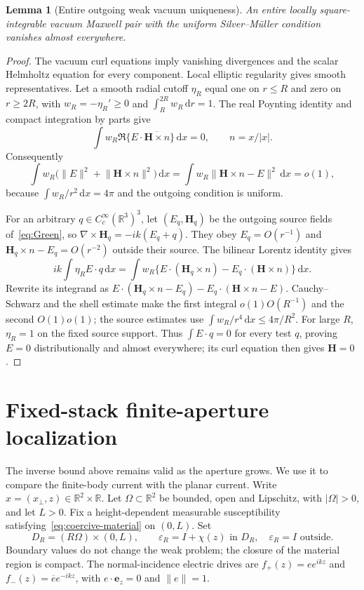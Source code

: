 \documentclass[11pt,a4paper]{article}
\newtheorem{lemma}[theorem]{Lemma}
\theoremstyle{remark}
\newcommand{\norm}[1]{\lVert #1\rVert}
\newcommand{\abs}[1]{\lvert #1\rvert}
\newcommand{\dd}{\,\mathrm d}
\newcommand{\ez}{\mathbf e_z}
\begin{document}
\begin{lemma}[Entire outgoing weak vacuum uniqueness]\label{lem:vacuum-uniqueness}
An entire locally square-integrable vacuum Maxwell pair with the uniform Silver--M\"uller condition vanishes almost everywhere.
\end{lemma}
\begin{proof}
The vacuum curl equations imply vanishing divergences and the scalar Helmholtz equation for every component. Local elliptic regularity gives smooth representatives. Let a smooth radial cutoff $\eta_R$ equal one on $r\leq R$ and zero on $r\geq2R$, with $w_R=-\eta_R'\geq0$ and $\int_R^{2R}w_R\dd r=1$. The real Poynting identity and compact integration by parts give
\[
 \int w_R\Re\{E\cdot\overline{\mathbf H\times n}\}\dd x=0,
 \qquad n=x/\abs x.
\]
Consequently
\[
 \int w_R\bigl(\norm E^2+\norm{\mathbf H\times n}^2\bigr)\dd x
 =\int w_R\norm{\mathbf H\times n-E}^2\dd x=o(1),
\]
because $\int w_R/r^2\dd x=4\pi$ and the outgoing condition is uniform.

For an arbitrary $q\in C_c^\infty(\mathbb R^3)^3$, let $(E_q,\mathbf H_q)$ be the outgoing source fields of~\eqref{eq:Green}, so $\nabla\times\mathbf H_q=-ik(E_q+q)$. They obey $E_q=O(r^{-1})$ and $\mathbf H_q\times n-E_q=O(r^{-2})$ outside their source. The bilinear Lorentz identity gives
\[
 ik\int\eta_RE\cdot q\dd x
 =\int w_R\{E\cdot(\mathbf H_q\times n)-E_q\cdot(\mathbf H\times n)\}\dd x.
\]
Rewrite its integrand as $E\cdot(\mathbf H_q\times n-E_q)-E_q\cdot(\mathbf H\times n-E)$. Cauchy--Schwarz and the shell estimate make the first integral $o(1)O(R^{-1})$ and the second $O(1)o(1)$; the source estimates use $\int w_R/r^4\dd x\leq4\pi/R^2$. For large $R$, $\eta_R=1$ on the fixed source support. Thus $\int E\cdot q=0$ for every test $q$, proving $E=0$ distributionally and almost everywhere; its curl equation then gives $\mathbf H=0$.
\end{proof}

\section{Fixed-stack finite-aperture localization}\label{sec:localization}
The inverse bound above remains valid as the aperture grows. We use it to compare the finite-body current with the planar current. Write $x=(x_\perp,z)\in\mathbb R^2\times\mathbb R$. Let $\Omega\subset\mathbb R^2$ be bounded, open and Lipschitz, with $\abs\Omega>0$, and let $L>0$. Fix a height-dependent measurable susceptibility satisfying~\eqref{eq:coercive-material} on $(0,L)$. Set
\[
 D_R=(R\Omega)\times(0,L),\qquad
 \varepsilon_R=I+\chi(z)\text{ in }D_R,\quad\varepsilon_R=I\text{ outside}.
\]
Boundary values do not change the weak problem; the closure of the material region is compact. The normal-incidence electric drives are $f_+(z)=e e^{ikz}$ and $f_-(z)=\overline e e^{-ikz}$, with $e\cdot\ez=0$ and $\norm e=1$.
\end{document}
